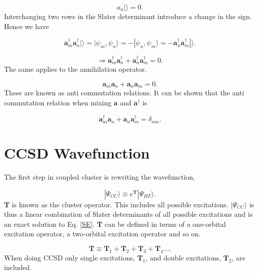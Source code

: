 \documentclass[a4paper,norsk,11pt,twoside]{report}
\begin{document}
\begin{equation}
a_n | \rangle = 0  .
\end{equation}
Interchanging two rows in the Slater determinant introduce a change in the sign. Hence we have

\begin{equation}
\textbf{a}^{\dag}_m \textbf{a}^{\dag}_n | \rangle = |\psi_m, \psi_n \rangle = - |\psi_n, \psi_m \rangle = -\textbf{a}^{\dag}_n \textbf{a}^{\dag}_m | \rangle  .
\end{equation}

\begin{equation}
\Rightarrow \textbf{a}^{\dag}_m \textbf{a}^{\dag}_n + \textbf{a}^{\dag}_n \textbf{a}^{\dag}_m = 0 .
\end{equation}
The same applies to the annihilation operator.

\begin{equation}
\textbf{a}_m \textbf{a}_n + \textbf{a}_n \textbf{a}_m = 0 .
\end{equation}
These are known as anti commutation relations. It can be shown that the anti commutation relation when mixing $\textbf{a}$ and $\textbf{a}^{\dag}$ is

\begin{equation}
\textbf{a}^{\dag}_m \textbf{a}_n + \textbf{a}_n \textbf{a}^{\dag}_m = \delta_{mn} . \label{ccsd_anni_creato_operator_combo}
\end{equation}

\section{CCSD Wavefunction}
The first step in coupled cluster is rewriting the wavefunction,

\begin{equation}
|\Psi_{CC} \rangle \equiv e^{\textbf{T}} | \Psi_{HF} \rangle .
\end{equation} 
$\textbf{T}$ is known as the cluster operator. This includes all possible excitations. $|\Psi_{CC} \rangle$ is thus a linear combination of Slater determinants of all possible excitations and is an exact solution to Eq. \eqref{SE}. $\textbf{T}$ can be defined in terms of a one-orbital excitation operator, a two-orbital excitation operator and so on.

\begin{equation}
\textbf{T} \equiv \textbf{T}_1 + \textbf{T}_2 + \textbf{T}_3 + \textbf{T}_4 \dots .
\end{equation}
When doing CCSD only single excitations, $\textbf{T}_1$, and double excitations, $\textbf{T}_2$, are included. 
\end{document}
